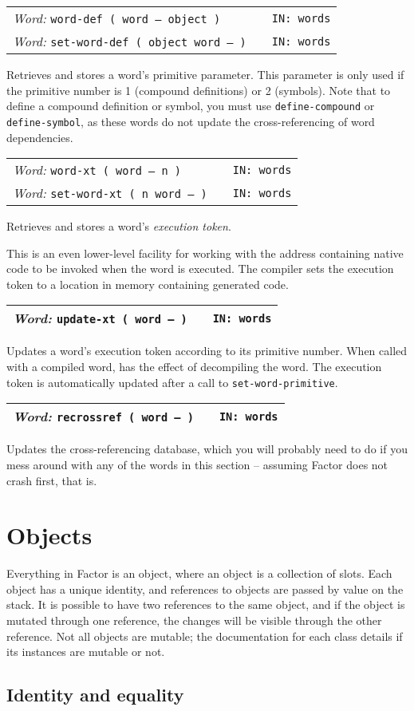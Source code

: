 \documentclass{report}
\newcommand{\ordinaryword}[3]{\index{#1}
\emph{Word:} \texttt{#2} &&\texttt{IN: #3}}
\newcommand{\wordtable}[1]{

\begin{tabularx}{12cm}[t]{lXr}
\hline
#1\\
\hline
\end{tabularx}

}
\begin{document}
\wordtable{
\ordinaryword{word-def}{word-def ( word -- object )}{words}\\
\ordinaryword{set-word-def}{set-word-def ( object word -- )}{words}
}
Retrieves and stores a word's primitive parameter. This parameter is only used if the primitive number is 1 (compound definitions) or 2 (symbols). Note that to define a compound definition or symbol, you must use \texttt{define-compound} or \texttt{define-symbol}, as these words do not update the cross-referencing of word dependencies.

\wordtable{
\ordinaryword{word-xt}{word-xt ( word -- n )}{words}\\
\ordinaryword{set-word-xt}{set-word-xt ( n word -- )}{words}
}
Retrieves and stores a word's \emph{execution token}.

This is an even lower-level facility for working with the address containing native code to be invoked when the word is executed. The compiler sets the execution token to a location in memory containing generated code.

\wordtable{
\ordinaryword{update-xt}{update-xt ( word -- )}{words}
}
Updates a word's execution token according to its primitive number. When called with a compiled word, has the effect of decompiling the word. The execution token is automatically updated after a call to \texttt{set-word-primitive}.

\wordtable{
\ordinaryword{recrossref}{recrossref ( word -- )}{words}
}
Updates the cross-referencing database, which you will probably need to do if you mess around with any of the words in this section -- assuming Factor does not crash first, that is.

\section{Objects}

\mutableglos

Everything in Factor is an object, where an object is a collection of slots. Each object has a unique identity, and references to objects are passed by value on the stack. It is possible to have two references to the same object, and if the object is mutated through one reference, the changes will be visible through the other reference. Not all objects are mutable; the documentation for each class details if its instances are mutable or not.

\subsection{\label{equality}Identity and equality}
\end{document}
